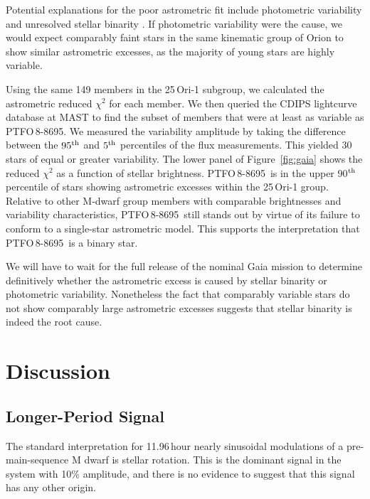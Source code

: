 \documentclass[12pt,twocolumn,tighten]{aastex62}
\newcommand{\ptfo}{PTFO$\,$8-8695}
\begin{document}
Potential explanations for the poor astrometric fit include
photometric variability and unresolved stellar binarity \citep[{\it
e.g.},][]{rizzuto_ZEIT8_2018,belokurov_unresolved_2020}.  If
photometric variability were the cause, we would expect comparably
faint stars in the same kinematic group of Orion to show similar
astrometric excesses, as the majority of young stars are highly
variable.

Using the same 149 members in the 25$\,$Ori-1 subgroup, we calculated
the astrometric reduced $\chi^2$ for each member.  We then queried the
CDIPS lightcurve database at MAST \citep{bouma_cluster_2019} to find
the subset of members that were at least as variable as \ptfo.
We measured the variability amplitude by taking the difference between the
$95^{\rm th}$ and $5^{\rm th}$ percentiles of the flux measurements.
This yielded 30 stars of equal or greater variability.
The lower panel of Figure~\ref{fig:gaia} shows the
reduced $\chi^2$ as a function of stellar brightness.  \ptfo\ is in
the upper 90$^{\rm th}$ percentile of stars showing astrometric
excesses within the 25$\,$Ori-1 group.  Relative to other M-dwarf
group members with comparable brightnesses and variability
characteristics, \ptfo\ still stands out by virtue of its failure
to conform to a single-star astrometric model. This supports
the interpretation that \ptfo\ is a binary star.

We will have to wait for the full release of the
nominal Gaia mission to determine definitively whether the astrometric
excess is caused by stellar binarity or photometric variability.
Nonetheless the fact that comparably variable stars do not show
comparably large astrometric excesses suggests that stellar binarity
is indeed the root cause.

\section{Discussion}
\label{sec:discussion}

\subsection{Longer-Period Signal}

The standard interpretation for 11.96$\,$hour nearly sinusoidal modulations
of a pre-main-sequence M dwarf is stellar rotation.  This is the
dominant signal in the system with 10\% amplitude, and there is no
evidence to suggest that this signal has any other origin.
\end{document}
